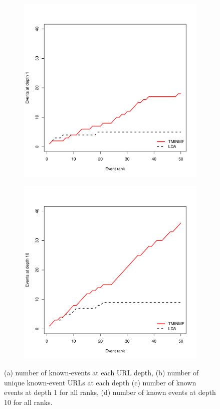 \documentclass{sig-alternate}
\begin{document}
\begin{figure}[!ht]
\begin{subfigure}{.5\textwidth}
\end{subfigure}
\begin{subfigure}{.5\textwidth}
  \centering
\includegraphics[width=10cm]{plots/events_at_rank_1.pdf}
\end{subfigure}%
\begin{subfigure}{.5\textwidth}
  \centering
\includegraphics[width=10cm]{plots/events_at_rank_10.pdf}
\end{subfigure}
\caption{(a) number of known-events at each URL depth, (b) number of unique known-event URLs at each depth (c) number of known events at depth 1 for all ranks, (d) number of known events at depth 10 for all ranks.}
\label{fig.eventdist}
\end{figure}
\end{document}
